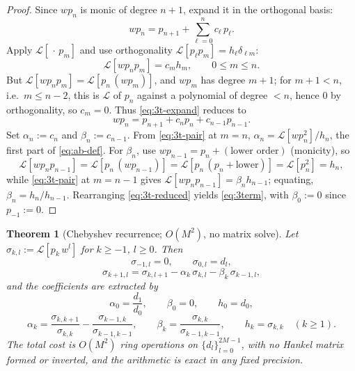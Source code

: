 \documentclass[11pt]{article}
\newtheorem{theorem}{Theorem}[section]
\newcommand{\Lc}{\mathcal{L}}
\begin{document}
\begin{proof}
Since $w p_n$ is monic of degree $n+1$, expand it in the orthogonal basis:
\begin{equation}\label{eq:3t-expand}
w p_n=p_{n+1}+\sum_{\ell=0}^{n}c_\ell\,p_\ell .
\end{equation}
Apply $\Lc[\,\cdot\,p_m]$ and use orthogonality $\Lc[p_\ell p_m]=h_\ell
\delta_{\ell m}$:
\begin{equation}\label{eq:3t-pair}
\Lc[w p_n p_m]=c_m h_m,\qquad 0\le m\le n .
\end{equation}
But $\Lc[w p_n p_m]=\Lc[p_n\,(w p_m)]$, and $w p_m$ has degree $m+1$; for
$m+1<n$, i.e.\ $m\le n-2$, this is $\Lc$ of $p_n$ against a polynomial of
degree $<n$, hence $0$ by orthogonality, so $c_m=0$. Thus
\eqref{eq:3t-expand} reduces to
\begin{equation}\label{eq:3t-reduced}
w p_n=p_{n+1}+c_n p_n+c_{n-1}p_{n-1}.
\end{equation}
Set $\alpha_n:=c_n$ and $\beta_n:=c_{n-1}$. From \eqref{eq:3t-pair} at $m=n$,
$\alpha_n=\Lc[w p_n^2]/h_n$, the first part of \eqref{eq:ab-def}. For
$\beta_n$, use $w p_{n-1}=p_n+(\text{lower order})$ (monicity), so
\begin{equation}\label{eq:3t-beta}
\Lc[w p_n p_{n-1}]=\Lc[p_n\,(w p_{n-1})]
=\Lc[p_n\,(p_n+\text{lower})]=\Lc[p_n^2]=h_n,
\end{equation}
while \eqref{eq:3t-pair} at $m=n-1$ gives $\Lc[wp_np_{n-1}]=\beta_n h_{n-1}$;
equating, $\beta_n=h_n/h_{n-1}$. Rearranging \eqref{eq:3t-reduced} yields
\eqref{eq:3term}, with $\beta_0:=0$ since $p_{-1}:=0$.
\end{proof}

\begin{theorem}[Chebyshev recurrence; $O(M^2)$, no matrix solve]\label{thm:cheb}
Let $\sigma_{k,l}:=\Lc[p_k\,w^{l}]$ for $k\ge-1$, $l\ge0$. Then
\begin{equation}\label{eq:cheb-init}
\sigma_{-1,l}=0,\qquad\sigma_{0,l}=d_l,
\end{equation}
\begin{equation}\label{eq:cheb-rec}
\sigma_{k+1,l}=\sigma_{k,l+1}-\alpha_k\,\sigma_{k,l}-\beta_k\,\sigma_{k-1,l},
\end{equation}
and the coefficients are extracted by
\begin{equation}\label{eq:cheb-extract0}
\alpha_0=\frac{d_1}{d_0},\qquad\beta_0=0,\qquad h_0=d_0,
\end{equation}
\begin{equation}\label{eq:cheb-extractk}
\alpha_k=\frac{\sigma_{k,k+1}}{\sigma_{k,k}}
-\frac{\sigma_{k-1,k}}{\sigma_{k-1,k-1}},\qquad
\beta_k=\frac{\sigma_{k,k}}{\sigma_{k-1,k-1}},\qquad
h_k=\sigma_{k,k}\quad(k\ge1).
\end{equation}
The total cost is $O(M^2)$ ring operations on $\{d_l\}_{l=0}^{2M-1}$, with
no Hankel matrix formed or inverted, and the arithmetic is exact in any
fixed precision.
\end{theorem}
\end{document}
